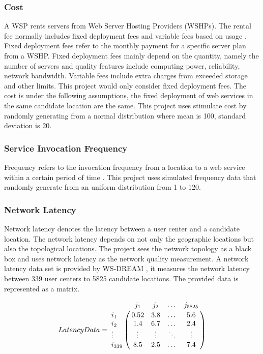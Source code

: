 \subsubsection{Cost}
\label{sec:costdata}
A WSP rents servers from Web Server Hosting Providers (WSHPs). 
The rental fee  normally includes fixed deployment fees and variable fees based on usage \cite{Sun:2003:}. 
Fixed deployment fees  refer to the monthly payment for a specific server plan from a WSHP. 
Fixed deployment fees  mainly depend on the quantity, namely the number of servers and quality features include computing power, 
reliability, network bandwidth. Variable fees include extra charges from exceeded storage and other limits.
This project would only consider fixed deployment fees. The cost is under the following assumptions, 
the fixed deployment of web services in the same candidate location are the same. 
This project uses stimulate cost by randomly generating from a normal distribution where mean is 100, standard deviation is 20. 

\subsubsection{Service Invocation Frequency}
\label{sec:frequencydata}
Frequency refers to the invocation frequency from a location to a web service within a certain period of time \cite{Huang:2013:}. 
This project uses simulated frequency data that randomly generate from an uniform distribution from 1 to 120.

\subsubsection{Network Latency}
\label{sec:latencydata}
Network latency denotes the latency between a user center and a candidate location. 
The network latency depends on not only the geographic locations but also the topological locations. 
The project sees the network topology as a black box and uses network latency as the network quality measurement. 
A network latency data set is provided by WS-DREAM \cite{6076756} \cite{5552800}, 
it measures the network latency between 339 user centers to 5825 candidate locations. 
The provided data is represented as a matrix.

$$
Latency Data = \bbordermatrix{~ & j_{1} & j_{2} & \dots &j_{5825}  \cr
					i_{1}	&0.52 &3.8 &\dots &5.6	\cr
					i_{2}	&1.4  &6.7 &\dots &2.4 \cr
					\vdots  &\vdots &\vdots &\ddots &\vdots \cr
					i_{339}	&8.5 &2.5 &\dots &7.4 \cr}
$$


